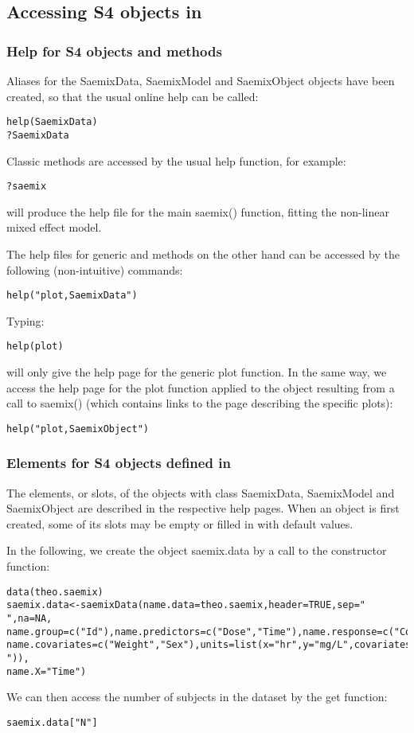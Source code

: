 \subsection{Accessing S4 objects in \saemix}

\subsubsection{Help for S4 objects and methods}

Aliases for the {\sf SaemixData}, {\sf SaemixModel} and {\sf SaemixObject} objects have been created, so that the usual online help can be called:
\begin{verbatim}
help(SaemixData)
?SaemixData
\end{verbatim}

Classic methods are accessed by the usual help function, for example:
\begin{verbatim}
?saemix
\end{verbatim}
will produce the help file for the main {\sf saemix()} function, fitting the non-linear mixed effect model.

The help files for generic and methods on the other hand can be accessed by the following (non-intuitive) commands:
\begin{verbatim}
help("plot,SaemixData")
\end{verbatim}
Typing:
\begin{verbatim}
help(plot)
\end{verbatim}
will only give the help page for the generic \R plot function. In the same way, we access the help page for the plot function applied to the object resulting from a call to {\sf saemix()} (which contains links to the page describing the specific plots):
\begin{verbatim}
help("plot,SaemixObject")
\end{verbatim}

\subsubsection{Elements for S4 objects defined in \saemix}

The elements, or slots, of the objects with class {\sf SaemixData}, {\sf SaemixModel} and {\sf SaemixObject} are described in the respective help pages. When an object is first created, some of its slots may be empty or filled in with default values.

In the following, we create the object {\sf saemix.data} by a call to the constructor function:
\begin{verbatim}
data(theo.saemix)
saemix.data<-saemixData(name.data=theo.saemix,header=TRUE,sep=" ",na=NA,
name.group=c("Id"),name.predictors=c("Dose","Time"),name.response=c("Concentration"),
name.covariates=c("Weight","Sex"),units=list(x="hr",y="mg/L",covariates=c("kg","-")),
name.X="Time")
\end{verbatim}
We can then access the number of subjects in the dataset by the get function:
\begin{verbatim}
saemix.data["N"]
\end{verbatim}

